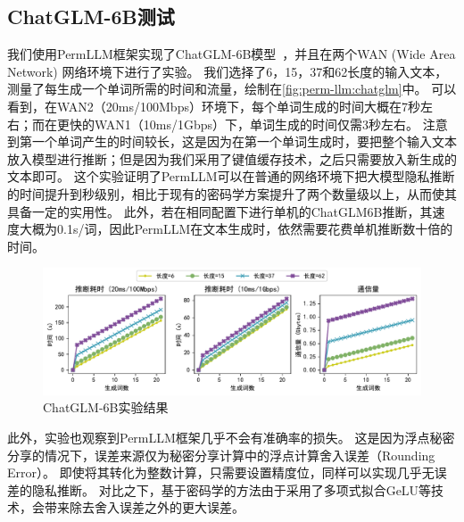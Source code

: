 \subsection{ChatGLM-6B测试}
我们使用PermLLM框架实现了ChatGLM-6B模型~\cite{zeng_2022_glm130b}，并且在两个WAN (Wide Area Network) 网络环境下进行了实验。
%
我们选择了6，15，37和62长度的输入文本，测量了每生成一个单词所需的时间和流量，绘制在\autoref{fig:perm-llm:chatglm}中。
%
可以看到，在WAN2（20ms/100Mbps）环境下，每个单词生成的时间大概在7秒左右；而在更快的WAN1（10ms/1Gbps）下，单词生成的时间仅需3秒左右。
%
注意到第一个单词产生的时间较长，这是因为在第一个单词生成时，要把整个输入文本放入模型进行推断；但是因为我们采用了键值缓存技术，之后只需要放入新生成的文本即可。
%
这个实验证明了PermLLM可以在普通的网络环境下把大模型隐私推断的时间提升到秒级别，相比于现有的密码学方案提升了两个数量级以上，从而使其具备一定的实用性。
%
此外，若在相同配置下进行单机的ChatGLM6B推断，其速度大概为0.1s/词，因此PermLLM在文本生成时，依然需要花费单机推断数十倍的时间。


\begin{figure}[htbp]
    \centering
    \includegraphics[width=\linewidth]{Z_Resources/perm-llm_ChatGLM.pdf}
    \caption{ChatGLM-6B实验结果}
    \label{fig:perm-llm:chatglm}
\end{figure}


此外，实验也观察到PermLLM框架几乎不会有准确率的损失。
%
这是因为浮点秘密分享的情况下，误差来源仅为秘密分享计算中的浮点计算舍入误差（Rounding Error）。
%
即使将其转化为整数计算，只需要设置精度位，同样可以实现几乎无误差的隐私推断。
%
对比之下，基于密码学的方法由于采用了多项式拟合GeLU等技术，会带来除去舍入误差之外的更大误差。